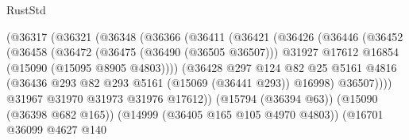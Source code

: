 \begin{lexlean}{RustStd}
\begin{coremodule}
                                    (@36317
                                      (@36321
                                        (@36348
                                          (@36366
                                            (@36411
                                              (@36421
                                                (@36426
                                                  (@36446
                                                    (@36452
                                                      (@36458
                                                        (@36472
                                                          (@36475 (@36490 (@36505 @36507)))
                                                          @31927
                                                          @17612
                                                          @16854
                                                          (@15090 (@15095 @8905 @4803))))
                                                      (@36428
                                                        @297
                                                        @124
                                                        @82
                                                        @25
                                                        @5161
                                                        @4816
                                                        (@36436
                                                          @293
                                                          @82
                                                          @293
                                                          @5161
                                                          (@15069 (@36441 @293))
                                                          @16998)
                                                        @36507))))
                                                @31967
                                                @31970
                                                @31973
                                                @31976
                                                @17612))
                                            (@15794 (@36394 @63))
                                            (@15090 (@36398 @682 @165))
                                            (@14999 (@36405 @165 @105 @4970 @4803))
                                            (@16701
                                              @36099
                                              @4627
                                              @140

\end{coremodule}
\end{lexlean}

